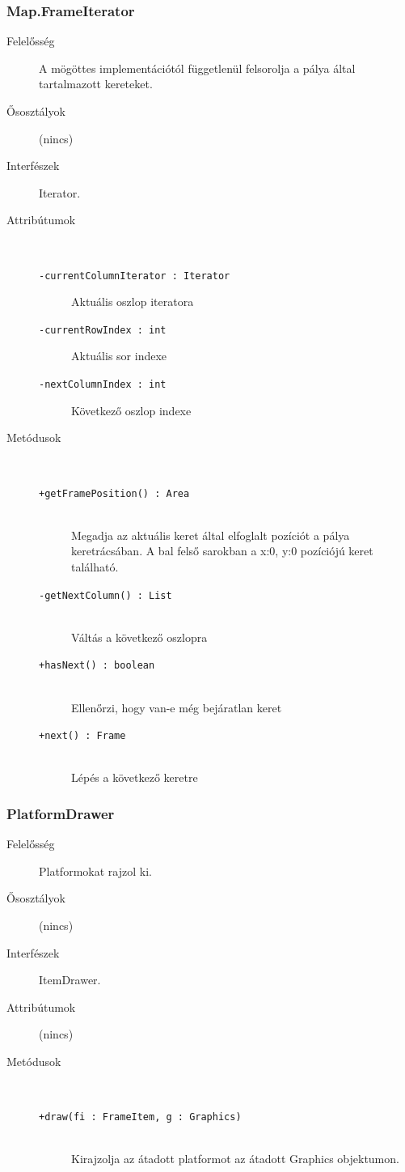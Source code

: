		\subsubsection{Map.FrameIterator}
			\begin{description}

				\item[Felelősség] A mögöttes implementációtól függetlenül felsorolja a pálya által tartalmazott kereteket.

				\item[Ősosztályok] (nincs)
				\item[Interfészek] Iterator.
				\item[Attribútumok]$\ $
					\begin{description}
						\item[\texttt{-currentColumnIterator : Iterator}]Aktuális oszlop iteratora
						\item[\texttt{-currentRowIndex : int}]Aktuális sor indexe
						\item[\texttt{-nextColumnIndex : int}]Következő oszlop indexe
					\end{description}
				\item[Metódusok]$\ $
					\begin{description}
						\item[\texttt{+getFramePosition() : Area}] \hfill \\Megadja az aktuális keret által elfoglalt  pozíciót a pálya keretrácsában.    A bal felső sarokban a x:0, y:0  pozíciójú keret található. 
						\item[\texttt{-getNextColumn() : List}] \hfill \\Váltás a következő oszlopra 
						\item[\texttt{+hasNext() : boolean}] \hfill \\Ellenőrzi, hogy van-e még bejáratlan keret 
						\item[\texttt{+next() : Frame}] \hfill \\Lépés a következő keretre 
					\end{description}
			\end{description}
			
		\subsubsection{PlatformDrawer}
			\begin{description}

				\item[Felelősség] Platformokat rajzol ki.

				\item[Ősosztályok] (nincs)
				\item[Interfészek] ItemDrawer.
				\item[Attribútumok] (nincs)
				\item[Metódusok]$\ $
					\begin{description}
						\item[\texttt{+draw(fi : FrameItem, g : Graphics)}] \hfill \\Kirajzolja az átadott platformot az átadott Graphics objektumon. 
					\end{description}
			\end{description}

